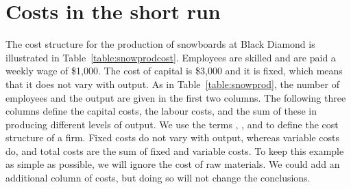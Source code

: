 \section{Costs in the short run}\label{sec:ch8sec4}

The cost structure for the production of snowboards at Black Diamond is
illustrated in Table~\ref{table:snowprodcost}. Employees are skilled and are
paid a weekly wage of \$1,000. The cost of capital is \$3,000 and it is fixed,
which means that it does not vary with output. As in Table~\ref{table:snowprod},
the number of employees and the output are given in the
first two columns. The following three columns define the capital costs, the
labour costs, and the sum of these in producing different levels of output.
We use the terms , , and 
 to define the cost structure of a firm. Fixed
costs do not vary with output, whereas variable costs do, and total costs
are the sum of fixed and variable costs. To keep this example as simple as
possible, we will ignore the cost of raw materials. We could add an
additional column of costs, but doing so will not change the conclusions.

